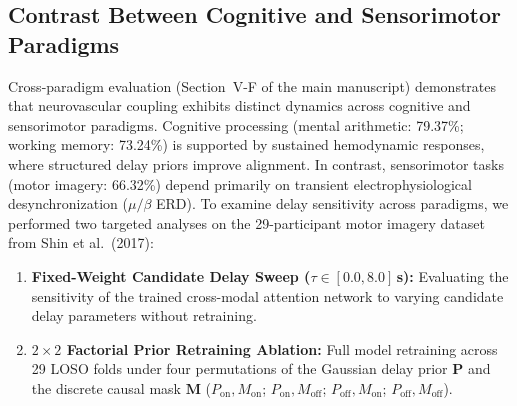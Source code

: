 \documentclass[journal]{IEEEtran}
\begin{document}
\subsection{Contrast Between Cognitive and Sensorimotor Paradigms}
Cross-paradigm evaluation (Section~V-F of the main manuscript) demonstrates that neurovascular coupling exhibits distinct dynamics across cognitive and sensorimotor paradigms. Cognitive processing (mental arithmetic: 79.37\%; working memory: 73.24\%) is supported by sustained hemodynamic responses, where structured delay priors improve alignment. In contrast, sensorimotor tasks (motor imagery: 66.32\%) depend primarily on transient electrophysiological desynchronization ($\mu/\beta$ ERD). To examine delay sensitivity across paradigms, we performed two targeted analyses on the 29-participant motor imagery dataset from Shin et al.\ (2017):
\begin{enumerate}
    \item \textbf{Fixed-Weight Candidate Delay Sweep ($\tau \in [0.0, 8.0]$\,s):} Evaluating the sensitivity of the trained cross-modal attention network to varying candidate delay parameters without retraining.
    \item \textbf{$2 \times 2$ Factorial Prior Retraining Ablation:} Full model retraining across 29 LOSO folds under four permutations of the Gaussian delay prior $\mathbf{P}$ and the discrete causal mask $\mathbf{M}$ ($P_{\mathrm{on}}, M_{\mathrm{on}}$; $P_{\mathrm{on}}, M_{\mathrm{off}}$; $P_{\mathrm{off}}, M_{\mathrm{on}}$; $P_{\mathrm{off}}, M_{\mathrm{off}}$).
\end{enumerate}
\end{document}
